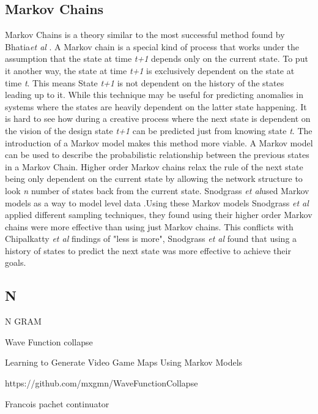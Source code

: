 \documentclass[journal]{IEEEtran}
\begin{document}
\subsection{Markov Chains}
Markov Chains is a theory similar to the most successful method found by Bhatia\textit{et al} \cite{bhatia2016targeted}. A Markov chain is a special kind of process that works under the assumption that the state at time \textit{t+1} depends only on the current state. To put it another way, the state at time \textit{t+1} is exclusively dependent on the state at time \textit{t}. This means State \textit{t+1}  is not dependent on the history of the states leading up to it\cite{ye2000markov}. While this technique may be useful for predicting anomalies in systems \cite{ju2001hybrid, gwadera2005markov, ye2000markov} where the states are heavily dependent on the latter state happening. It is hard to see how during a creative process where the next state is dependent on the vision of the design state \textit{t+1} can be predicted just from knowing state \textit{t}. The introduction of a Markov model makes this method more viable. A Markov model can be used to describe the probabilistic relationship between the previous states in a Markov Chain\cite{markov1971extension}.  Higher order Markov chains relax the rule of the next state being only dependent on the current state by allowing the network structure to look \textit{n} number of states back from the current state\cite{ching2008higher}. Snodgrass \textit{et al}\cite{snodgrass2017learning}used Markov models as a way to model level data  .Using these Markov models Snodgrass \textit{et al}\cite{snodgrass2017learning} applied different sampling techniques, they found using their higher order Markov chains were more effective than using just Markov chains.  This conflicts with Chipalkatty \textit{et al}\cite{chipalkatty2013less} findings of "less is more", Snodgrass \textit{et al}\cite{snodgrass2017learning} found that using a history of states to predict the next state was more effective to achieve their goals.

\subsection{N }
N GRAM 

Wave Function collapse

Learning to Generate Video Game Maps Using Markov Models

https://github.com/mxgmn/WaveFunctionCollapse

Francois pachet continuator 
\end{document}
